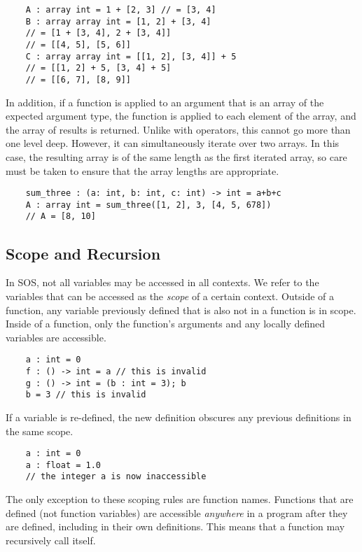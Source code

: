\documentclass[main.tex]{subfiles}
\begin{document}
	\begin{lstlisting}
	A : array int = 1 + [2, 3] // = [3, 4]
	B : array array int = [1, 2] + [3, 4]
	// = [1 + [3, 4], 2 + [3, 4]]
	// = [[4, 5], [5, 6]] 
	C : array array int = [[1, 2], [3, 4]] + 5
	// = [[1, 2] + 5, [3, 4] + 5]
	// = [[6, 7], [8, 9]]\end{lstlisting}
	
	In addition, if a function is applied to an argument that is an array of the expected argument type, the function is applied to each element of the array, and the array of results is returned. Unlike with operators, this cannot go more than one level deep. However, it can simultaneously iterate over two arrays. In this case, the resulting array is of the same length as the first iterated array, so care must be taken to ensure that the array lengths are appropriate.
	
	\begin{lstlisting}
	sum_three : (a: int, b: int, c: int) -> int = a+b+c
	A : array int = sum_three([1, 2], 3, [4, 5, 678])
	// A = [8, 10] \end{lstlisting}
	
	\subsection{Scope and Recursion}
	In SOS, not all variables may be accessed in all contexts. We refer to the variables that can be accessed as the \textit{scope} of a certain context. Outside of a function, any variable previously defined that is also not in a function is in scope. Inside of a function, only the function's arguments and any locally defined variables are accessible.
	
	\begin{lstlisting} 
	a : int = 0
	f : () -> int = a // this is invalid
	g : () -> int = (b : int = 3); b
	b = 3 // this is invalid \end{lstlisting}
	
	If a variable is re-defined, the new definition obscures any previous definitions in the same scope.
	
	\begin{lstlisting}
	a : int = 0
	a : float = 1.0
	// the integer a is now inaccessible \end{lstlisting}
	
	The only exception to these scoping rules are function names. Functions that are defined (not function variables) are accessible \textit{anywhere} in a program after they are defined, including in their own definitions. This means that a function may recursively call itself.
	
\end{document}
